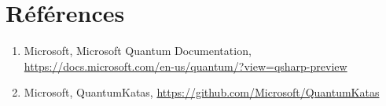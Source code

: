 \documentclass[12pt,a4paper]{article}
\begin{document}
\section{Références}

\begin{enumerate}
    \item Microsoft, Microsoft Quantum Documentation, \url{https://docs.microsoft.com/en-us/quantum/?view=qsharp-preview}
    \item Microsoft, QuantumKatas, \url{https://github.com/Microsoft/QuantumKatas}
\end{enumerate}

\end{document}
